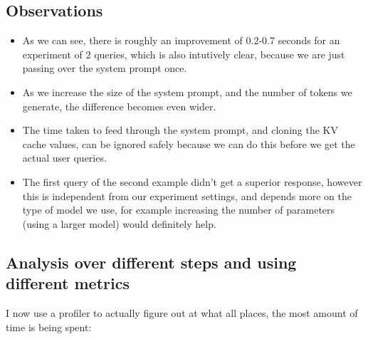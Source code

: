 \subsection{Observations}
\begin{itemize}
    \item As we can see, there is roughly an improvement of 0.2-0.7 seconds for an experiment of 2 queries, which is also intutively clear, because we are just passing over the system prompt once.
    \item As we increase the size of the system prompt, and the number of tokens we generate, the difference becomes even wider.
    \item The time taken to feed through the system prompt, and cloning the KV cache values, can be ignored safely because we can do this before we get the actual user queries.
    \item The first query of the second example didn't get a superior response, however this is independent from our experiment settings, and depends more on the type of model we use, for example increasing the number of parameters (using a larger model) would definitely help.
\end{itemize}



\subsection{Analysis over different steps and using different metrics}
I now use a profiler to actually figure out at what all places, the most amount of time is being spent:


